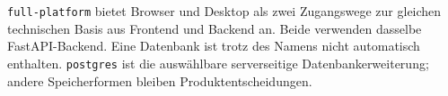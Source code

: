 \begin{beginnerstatement}

\texttt{full-platform} bietet Browser und Desktop als zwei Zugangswege zur
gleichen technischen Basis aus Frontend und Backend an. Beide verwenden dasselbe
FastAPI-Backend. Eine Datenbank ist trotz des Namens nicht automatisch
enthalten. \texttt{postgres} ist die auswählbare serverseitige
Datenbankerweiterung; andere Speicherformen bleiben Produktentscheidungen.

\end{beginnerstatement}
